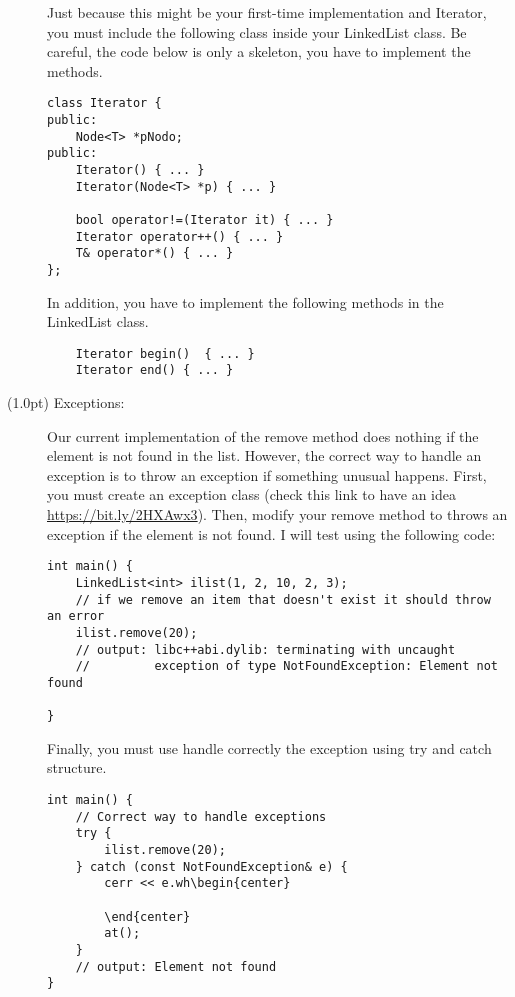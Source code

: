 \documentclass{article}
\begin{document}
\begin{description}
Just because this might be your first-time implementation and Iterator, you must include the following class inside your LinkedList class. Be careful, the code below is only a skeleton, you have to implement the methods. 

\begin{lstlisting}
class Iterator {
public:
    Node<T> *pNodo;
public:
    Iterator() { ... }
    Iterator(Node<T> *p) { ... }

    bool operator!=(Iterator it) { ... }
    Iterator operator++() { ... }
    T& operator*() { ... }
};
\end{lstlisting}

In addition, you have to implement the following methods in the LinkedList class. 

\begin{lstlisting}
    Iterator begin()  { ... }
    Iterator end() { ... }
\end{lstlisting}
  
  \item[(1.0pt) Exceptions:] Our current implementation of the remove method does nothing if the element is not found in the list. However, the correct way to handle an exception is to throw an exception if something unusual happens. First, you must create an exception class (check this link to have an idea \url{https://bit.ly/2HXAwx3}). Then, modify your remove method to throws an exception if the element is not found. I will test using the following code: 

\begin{lstlisting}
int main() {
    LinkedList<int> ilist(1, 2, 10, 2, 3);
    // if we remove an item that doesn't exist it should throw an error
    ilist.remove(20);
    // output: libc++abi.dylib: terminating with uncaught
    //         exception of type NotFoundException: Element not found

}
\end{lstlisting}

Finally, you must use handle correctly the exception using try and catch structure.
  
\begin{lstlisting}
int main() {
    // Correct way to handle exceptions
    try {
        ilist.remove(20);
    } catch (const NotFoundException& e) {
        cerr << e.wh\begin{center}
        
        \end{center}
        at();
    }
    // output: Element not found
}
\end{lstlisting}
  
\end{description}
\end{document}
